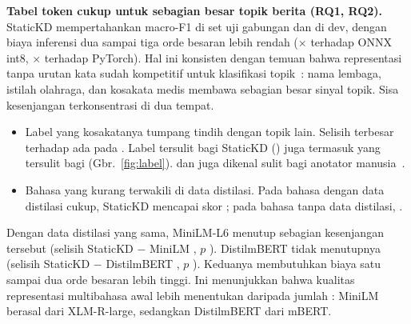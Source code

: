 \textbf{Tabel token cukup untuk sebagian besar topik berita (RQ1, RQ2).} StaticKD mempertahankan  macro-F1  di set uji gabungan dan  di dev, dengan biaya inferensi dua sampai tiga orde besaran lebih rendah ($\times$ terhadap ONNX int8, $\times$ terhadap PyTorch). Hal ini konsisten dengan temuan bahwa representasi tanpa urutan kata sudah kompetitif untuk klasifikasi topik~\cite{galke2022bow}: nama lembaga, istilah olahraga, dan kosakata medis membawa sebagian besar sinyal topik. Sisa kesenjangan terkonsentrasi di dua tempat.
\begin{itemize}
  \item Label yang kosakatanya tumpang tindih dengan topik lain. Selisih terbesar terhadap  ada pada . Label tersulit bagi StaticKD () juga termasuk yang tersulit bagi  (Gbr.~\ref{fig:label}).  dan  juga dikenal sulit bagi anotator manusia~\cite{kuzman2025llm}.
  \item Bahasa yang kurang terwakili di data distilasi. Pada bahasa dengan data distilasi cukup, StaticKD mencapai  skor ; pada bahasa tanpa data distilasi, .
\end{itemize}
Dengan data distilasi yang sama, MiniLM-L6 menutup sebagian kesenjangan tersebut (selisih StaticKD $-$ MiniLM , $p$ ). DistilmBERT tidak menutupnya (selisih StaticKD $-$ DistilmBERT , $p$ ). Keduanya membutuhkan biaya satu sampai dua orde besaran lebih tinggi. Ini menunjukkan bahwa kualitas representasi multibahasa awal lebih menentukan daripada jumlah : MiniLM berasal dari XLM-R-large, sedangkan DistilmBERT dari mBERT.

